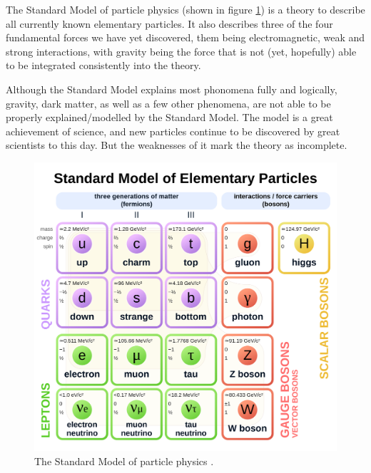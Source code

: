 \documentclass[a4paper,10pt]{scrartcl}
\begin{document}

The Standard Model of particle physics (shown in figure \ref{fig:standardmodel}) is a theory to describe all currently known elementary particles.
It also describes three of the four fundamental forces we have yet discovered, them being electromagnetic, weak and strong interactions, with gravity being the force that is not (yet, hopefully) able to be integrated consistently into the theory.

Although the Standard Model explains most phonomena fully and logically, gravity, dark matter, as well as a few other phenomena, are not able to be properly explained/modelled by the Standard Model.
The model is a great achievement of science, and new particles continue to be discovered by great scientists to this day.
But the weaknesses of it mark the theory as incomplete.

\begin{figure}[h]
    \includegraphics[scale=0.12]{images/Standard_Model_of_Elementary_Particles.svg.png}
    \centering
    \caption{The Standard Model of particle physics \cite{wiki:Standard_Model}.}
    \label{fig:standardmodel}
\end{figure}
\end{document}
